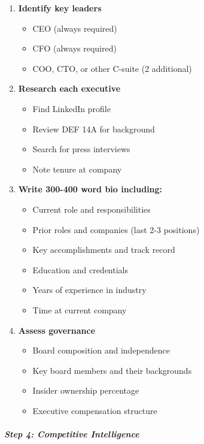 \documentclass[11pt]{article}
\begin{document}
\begin{enumerate}[leftmargin=*,itemsep=2pt,topsep=2pt]
\item {} \textbf{Identify key leaders}
\begin{itemize}[leftmargin=*,itemsep=2pt,topsep=2pt]
\item {} CEO (always required)
\item {} CFO (always required)
\item {} COO, CTO, or other C-suite (2 additional)
\end{itemize}
\item {} \textbf{Research each executive}
\begin{itemize}[leftmargin=*,itemsep=2pt,topsep=2pt]
\item {} Find LinkedIn profile
\item {} Review DEF 14A for background
\item {} Search for press interviews
\item {} Note tenure at company
\end{itemize}
\item {} \textbf{Write 300-400 word bio including:}
\begin{itemize}[leftmargin=*,itemsep=2pt,topsep=2pt]
\item {} Current role and responsibilities
\item {} Prior roles and companies (last 2-3 positions)
\item {} Key accomplishments and track record
\item {} Education and credentials
\item {} Years of experience in industry
\item {} Time at current company
\end{itemize}
\item {} \textbf{Assess governance}
\begin{itemize}[leftmargin=*,itemsep=2pt,topsep=2pt]
\item {} Board composition and independence
\item {} Key board members and their backgrounds
\item {} Insider ownership percentage
\item {} Executive compensation structure
\end{itemize}
\end{enumerate}

\subparagraph{Step 4: Competitive Intelligence}\mbox{}\par
\end{document}
